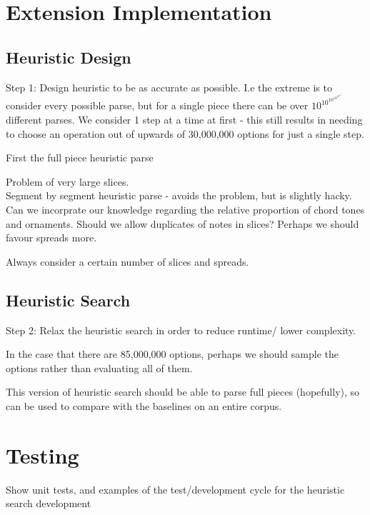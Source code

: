 \documentclass[12pt,a4paper,twoside,openright]{report}
\begin{document}
\section{Extension Implementation}

\subsection{Heuristic Design}
Step 1: Design heuristic to be as accurate as possible. I.e the extreme is to consider every possible parse, but for a single piece there can be over $10^{10^{10^{10^{10^{10}}}}}$ different parses. We consider 1 step at a time at first - this still results in needing to choose an operation out of upwards of 30,000,000 options for just a single step.     
\par
First the full piece heuristic parse 
\par
Problem of very large slices.\\ 
Segment by segment heuristic parse - avoids the problem, but is slightly hacky. Can we incorprate our knowledge regarding the relative proportion of chord tones and ornaments. Should we allow duplicates of notes in slices? Perhaps we should favour spreads more. 
\par
Always consider a certain number of slices and spreads.
\par

\subsection{Heuristic Search}
Step 2: Relax the heuristic search in order to reduce runtime/ lower complexity.
\par 
In the case that there are 85,000,000 options, perhaps we should sample the options rather than evaluating all of them. 
\par 
This version of heuristic search should be able to parse full pieces (hopefully), so can be used to compare with the baselines on an entire corpus.

\section{Testing}
Show unit tests, and examples of the test/development cycle for the heuristic search development

\end{document}
